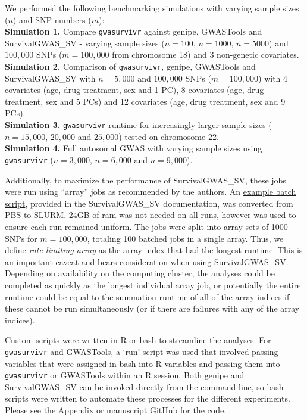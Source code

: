 \documentclass[]{DissertateOSU}
\begin{document}
We performed the following benchmarking simulations with varying sample
sizes (\(n\)) and SNP numbers (\(m\)):\\
\noindent \textbf{Simulation 1.} Compare \texttt{gwasurvivr} against
genipe, GWASTools and SurvivalGWAS\_SV - varying sample sizes
(\(n=100\), \(n=1000\), \(n=5000\)) and \(100,000\) SNPs (\(m=100,000\)
from chromosome 18) and 3 non-genetic covariates.\\
\noindent \textbf{Simulation 2.} Comparison of \texttt{gwasurvivr},
genipe, GWASTools and SurvivalGWAS\_SV with \(n=5,000\) and \(100,000\)
SNPs (\(m=100,000\)) with 4 covariates (age, drug treatment, sex and 1
PC), 8 covariates (age, drug treatment, sex and 5 PCs) and 12 covariates
(age, drug treatment, sex and 9 PCs).\\
\noindent \textbf{Simulation 3.} \texttt{gwasurvivr} runtime for
increasingly larger sample sizes (\(n=15,000\), \(20,000\) and
\(25,000\)) tested on chromosome 22.\\
\noindent \textbf{Simulation 4.} Full autosomal GWAS with varying sample
sizes using \texttt{gwasurvivr} (\(n=3,000\), \(n=6,000\) and
\(n=9,000\)).

Additionally, to maximize the performance of SurvivalGWAS\_SV, these
jobs were run using ``array'' jobs as recommended by the authors. An
\href{https://www.liverpool.ac.uk/media/livacuk/instituteoftranslationalmedicine/biostats/batchexample.sh}{example
batch script}, provided in the SurvivalGWAS\_SV documentation, was
converted from PBS to SLURM. 24GB of ram was not needed on all runs,
however was used to ensure each run remained uniform. The jobs were
split into array sets of 1000 SNPs for \(m=100,000\), totaling 100
batched jobs in a single array. Thus, we define \emph{rate-limiting
array} as the array index that had the longest runtime. This is an
important caveat and bears consideration when using SurvivalGWAS\_SV.
Depending on availability on the computing cluster, the analyses could
be completed as quickly as the longest individual array job, or
potentially the entire runtime could be equal to the summation runtime
of all of the array indices if these cannot be run simultaneously (or if
there are failures with any of the array indices).

Custom scripts were written in R or bash to streamline the analyses. For
\texttt{gwasurvivr} and GWASTools, a `run' script was used that involved
passing variables that were assigned in bash into R variables and
passing them into \texttt{gwasurvivr} or GWASTools within an R session.
Both genipe and SurvivalGWAS\_SV can be invoked directly from the
command line, so bash scripts were written to automate these processes
for the different experiments. Please see the Appendix or manuscript
GitHub for the code.
\end{document}
